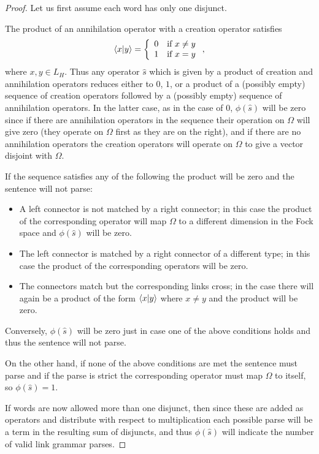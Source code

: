 \begin{proof}
Let us first assume each word has only one disjunct.

The product of an annihilation operator with a creation operator satisfies
$$\langle x| y\rangle = \left\{\begin{array}{ll}
0 & \textrm{if $x \neq y$}\\
1 & \textrm{if $x = y$}\end{array}\right.,$$
where $x, y \in L_H$. Thus any operator $\hat{s}$ which is given by a product of creation and annihilation operators reduces either to $0$, $1$, or a product of a (possibly empty) sequence of creation operators followed by a (possibly empty) sequence of annihilation operators. In the latter case, as in the case of $0$, $\phi(\hat{s})$ will be zero since if there are annihilation operators in the sequence their operation on $\Omega$ will give zero (they operate on $\Omega$ first as they are on the right), and if there are no annihilation operators the creation operators will operate on $\Omega$ to give a vector disjoint with $\Omega$.

If the sequence satisfies any of the following the product will be zero and the sentence will not parse:
\begin{itemize}
\item A left connector is not matched by a right connector; in this case the product of the corresponding operator will map $\Omega$ to a different dimension in the Fock space and $\phi(\hat{s})$ will be zero.
\item The left connector is matched by a right connector of a different type; in this case the product of the corresponding operators will be zero.
\item The connectors match but the corresponding links cross; in the case there will again be a product of the form $\langle x| y\rangle$ where $x\neq y$ and the product will be zero.
\end{itemize}
Conversely, $\phi(\hat{s})$ will be zero just in case one of the above conditions holds and thus the sentence will not parse.

On the other hand, if none of the above conditions are met the sentence must parse and if the parse is strict the corresponding operator must map $\Omega$ to itself, so $\phi(\hat{s}) = 1$.

If words are now allowed more than one disjunct, then since these are added as operators and distribute with respect to multiplication each possible parse will be a term in the resulting sum of disjuncts, and thus $\phi(\hat{s})$ will indicate the number of valid link grammar parses.
\end{proof}

